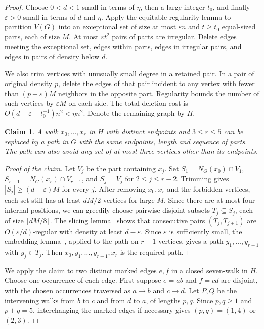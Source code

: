 \documentclass[10pt]{article}
\newtheorem*{claim*}{Claim}
\theoremstyle{remark}
\begin{document}
\begin{proof}
Choose $0<d<1$ small in terms of $\eta$, then a large integer $t_0$, and finally $\varepsilon>0$ small in terms of $d$ and $\eta$. Apply the equitable regularity lemma to partition $V(G)$ into an exceptional set of size at most $\varepsilon n$ and $t\ge t_0$ equal-sized parts, each of size $M$. At most $\varepsilon t^2$ pairs of parts are irregular. Delete edges meeting the exceptional set, edges within parts, edges in irregular pairs, and edges in pairs of density below $d$.

We also trim vertices with unusually small degree in a retained pair. In a pair of original density $p$, delete the edges of that pair incident to any vertex with fewer than $(p-\varepsilon)M$ neighbors in the opposite part. Regularity bounds the number of such vertices by $\varepsilon M$ on each side. The total deletion cost is $O(d+\varepsilon+t_0^{-1})n^2<\eta n^2$. Denote the remaining graph by $H$.

\begin{claim*}
      A walk $x_0,\ldots,x_r$ in $H$ with distinct endpoints and $3\le r\le5$ can be replaced by a path in $G$ with the same endpoints, length and sequence of parts. The path can also avoid any set of at most three vertices other than its endpoints.
\end{claim*}
\begin{proof}[Proof of the claim]
      Let $V_j$ be the part containing $x_j$. Set $S_1=N_G(x_0)\cap V_1$, $S_{r-1}=N_G(x_r)\cap V_{r-1}$, and $S_j=V_j$ for $2\le j\le r-2$. Trimming gives $|S_j|\ge(d-\varepsilon)M$ for every $j$. After removing $x_0,x_r$ and the forbidden vertices, each set still has at least $dM/2$ vertices for large $M$. Since there are at most four internal positions, we can greedily choose pairwise disjoint subsets $T_j\subseteq S_j$, each of size $\lfloor dM/8\rfloor$. The slicing lemma~\cite[Fact~1.5]{KS} shows that consecutive pairs $(T_j,T_{j+1})$ are $O(\varepsilon/d)$-regular with density at least $d-\varepsilon$. Since $\varepsilon$ is sufficiently small, the embedding lemma~\cite[Theorem~2.1]{KS}, applied to the path on $r-1$ vertices, gives a path $y_1,\ldots,y_{r-1}$ with $y_j\in T_j$. Then $x_0,y_1,\ldots,y_{r-1},x_r$ is the required path.
\end{proof}

We apply the claim to two distinct marked edges $e,f$ in a closed seven-walk in $H$. Choose one occurrence of each edge. First suppose $e=ab$ and $f=cd$ are disjoint, with the chosen occurrences traversed as $a\to b$ and $c\to d$. Let $P,Q$ be the intervening walks from $b$ to $c$ and from $d$ to $a$, of lengths $p,q$. Since $p,q\ge1$ and $p+q=5$, interchanging the marked edges if necessary gives $(p,q)=(1,4)$ or $(2,3)$.


\end{proof}
\end{document}
